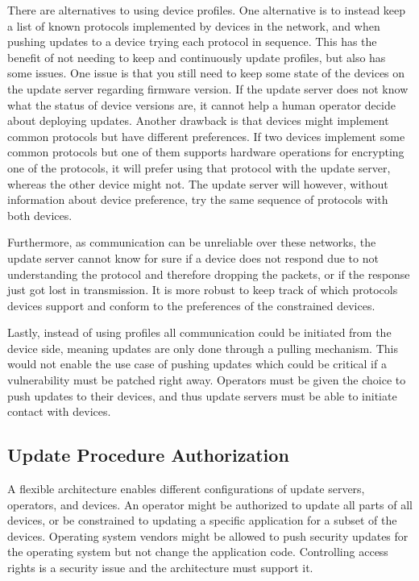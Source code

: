 \documentclass[0-thesis.tex]{subfiles}
\begin{document}
There are alternatives to using device profiles. One alternative is to instead keep a list
of known protocols implemented by devices in the network, and when pushing updates to a
device trying each protocol in sequence. This has the benefit of not needing to keep and
continuously update profiles, but also has some issues. One issue is that you still need
to keep some state of the devices on the update server regarding firmware version. If the
update server does not know what the status of device versions are, it cannot help a human
operator decide about deploying updates. Another drawback is that devices might implement
common protocols but have different preferences. If two devices implement some common
protocols but one of them supports hardware operations for encrypting one of the
protocols, it will prefer using that protocol with the update server, whereas the other
device might not. The update server will however, without information about device
preference, try the same sequence of protocols with both devices.

Furthermore, as communication can be unreliable over these networks, the update server
cannot know for sure if a device does not respond due to not understanding the protocol
and therefore dropping the packets, or if the response just got lost in transmission. It
is more robust to keep track of which protocols devices support and conform to the
preferences of the constrained devices.

Lastly, instead of using profiles all communication could be initiated from the device
side, meaning updates are only done through a pulling mechanism. This would not enable the
use case of pushing updates which could be critical if a vulnerability must be patched
right away. Operators must be given the choice to push updates to their devices, and thus
update servers must be able to initiate contact with devices.

\subsection{Update Procedure Authorization}
\label{ssec:authorization}
A flexible architecture enables different configurations of update servers, operators, and
devices. An operator might be authorized to update all parts of all devices, or be
constrained to updating a specific application for a subset of the devices. Operating
system vendors might be allowed to push security updates for the operating system but not
change the application code. Controlling access rights is a security issue and the
architecture must support it.
\end{document}
